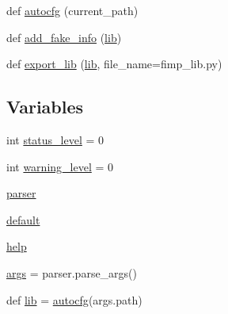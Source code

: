 \begin{DoxyCompactItemize}
\item 
def \hyperlink{namespacesylva_1_1code__generation_1_1vhdl__interface__parser_ac700c06f85e744c061a573dc897c9d6f}{autocfg} (current\+\_\+path)
\item 
def \hyperlink{namespacesylva_1_1code__generation_1_1vhdl__interface__parser_ac254ef348a92696ed564ed23a93249c7}{add\+\_\+fake\+\_\+info} (\hyperlink{namespacesylva_1_1code__generation_1_1vhdl__interface__parser_a2679c4ab5a9a87aa62090377cbe4c7f3}{lib})
\item 
def \hyperlink{namespacesylva_1_1code__generation_1_1vhdl__interface__parser_af7576699c6ef184fb26f0988bd9ab795}{export\+\_\+lib} (\hyperlink{namespacesylva_1_1code__generation_1_1vhdl__interface__parser_a2679c4ab5a9a87aa62090377cbe4c7f3}{lib}, file\+\_\+name=\textquotesingle{}fimp\+\_\+lib.\+py\textquotesingle{})
\end{DoxyCompactItemize}
\subsection*{Variables}
\begin{DoxyCompactItemize}
\item 
int \hyperlink{namespacesylva_1_1code__generation_1_1vhdl__interface__parser_ab023ab99252ae045bf3ce5e948f363ae}{status\+\_\+level} = 0
\item 
int \hyperlink{namespacesylva_1_1code__generation_1_1vhdl__interface__parser_aa82bc16742c29c741d43cf3819798d86}{warning\+\_\+level} = 0
\item 
\hyperlink{namespacesylva_1_1code__generation_1_1vhdl__interface__parser_ac1f7911c1fc284e53096dd7a52882152}{parser}
\item 
\hyperlink{namespacesylva_1_1code__generation_1_1vhdl__interface__parser_ac13539f10c901b6537c107ee60cc64b8}{default}
\item 
\hyperlink{namespacesylva_1_1code__generation_1_1vhdl__interface__parser_a20f64a1f69f2f14c50a7cdff5181e898}{help}
\item 
\hyperlink{namespacesylva_1_1code__generation_1_1vhdl__interface__parser_a3fd0b243c6ced038508dd7910723a009}{args} = parser.\+parse\+\_\+args()
\item 
def \hyperlink{namespacesylva_1_1code__generation_1_1vhdl__interface__parser_a2679c4ab5a9a87aa62090377cbe4c7f3}{lib} = \hyperlink{namespacesylva_1_1code__generation_1_1vhdl__interface__parser_ac700c06f85e744c061a573dc897c9d6f}{autocfg}(args.\+path)
\end{DoxyCompactItemize}


